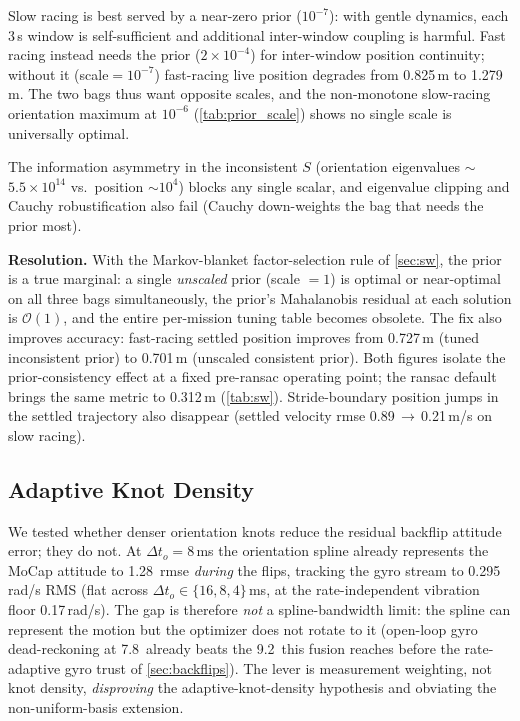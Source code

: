 Slow racing is best served by a near-zero prior ($10^{-7}$): with
gentle dynamics, each 3\,s window is self-sufficient and additional
inter-window coupling is harmful.  Fast racing instead needs the prior
($2{\times}10^{-4}$) for inter-window position continuity;
without it (scale$=10^{-7}$) fast-racing live position degrades from
0.825\,m to 1.279\,m.  The two bags thus want opposite scales, and the
non-monotone slow-racing orientation maximum at $10^{-6}$
(\autoref{tab:prior_scale}) shows no single scale is universally optimal.

The information asymmetry in the inconsistent $S$ (orientation
eigenvalues $\sim$$5.5{\times}10^{14}$ vs.\ position $\sim$$10^4$) blocks any
single scalar, and eigenvalue clipping and Cauchy robustification also fail
(Cauchy down-weights the bag that needs the prior most).

\textbf{Resolution.}
With the Markov-blanket factor-selection rule of \autoref{sec:sw},
the prior is a true marginal: a single \emph{unscaled} prior
(scale $=1$) is optimal or near-optimal on all three bags
simultaneously, the prior's Mahalanobis residual at each solution is
$\mathcal{O}(1)$, and the entire per-mission tuning table becomes
obsolete.  The fix also improves accuracy: fast-racing settled
position improves from 0.727\,m (tuned inconsistent prior) to
0.701\,m (unscaled consistent prior).  Both figures isolate the
prior-consistency effect at a fixed pre-\ac{ransac} operating point; the
\ac{ransac} default brings the same metric to 0.312\,m
(\autoref{tab:sw}).  Stride-boundary position
jumps in the settled trajectory also disappear (settled velocity \ac{rmse}
0.89\,$\to$\,0.21\,m/s on slow racing).

\subsection{Adaptive Knot Density}
\label{sec:negative}
We tested whether denser orientation knots reduce the residual backflip
attitude error; they do not.  At $\Delta t_o{=}8$\,ms the orientation
spline already represents the MoCap attitude to 1.28\degree\ \ac{rmse}
\emph{during} the flips, tracking the gyro stream to 0.295\,rad/s RMS (flat
across $\Delta t_o\in\{16,8,4\}$\,ms, at the rate-independent vibration
floor 0.17\,rad/s).  The gap is therefore \emph{not} a spline-bandwidth
limit: the spline can represent the motion but the optimizer does not
rotate to it (open-loop gyro dead-reckoning at 7.8\degree\ already beats the
9.2\degree\ this fusion reaches before the rate-adaptive gyro trust of
\autoref{sec:backflips}).  The lever is measurement weighting, not knot
density, \emph{disproving} the adaptive-knot-density hypothesis and obviating
the non-uniform-basis extension.
